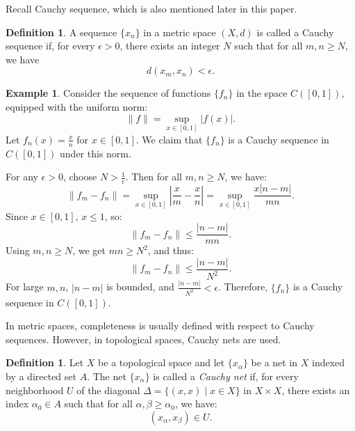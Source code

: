 \documentclass[12pt, reqno]{amsart}
\theoremstyle{definition}
\newtheorem{definition}[theorem]{Definition}
\newtheorem{example}[theorem]{Example}
\numberwithin{equation}{section}
\newcommand{\dR}{{\mathbb R}}
\begin{document}
Recall Cauchy sequence, which is also mentioned later in this paper.
\begin{definition}
    A sequence $ \{x_n\} $ in a metric space $(X, d)$ is called a Cauchy sequence if, for every $ \epsilon > 0 $, there exists an integer $ N $ such that for all $ m, n \geq N $, we have
\[ d(x_m, x_n) < \epsilon. \]
\end{definition}

\begin{example}
    Consider the sequence of functions \( \{f_n\} \) in the space \( C([0, 1]) \), equipped with the uniform norm:
    $$
    \|f\| = \sup_{x \in [0, 1]} |f(x)|.
    $$
    Let \( f_n(x) = \frac{x}{n} \) for \( x \in [0, 1] \). We claim that \( \{f_n\} \) is a Cauchy sequence in \( C([0, 1]) \) under this norm.

    For any \( \epsilon > 0 \), choose \( N > \frac{1}{\epsilon} \). Then for all \( m, n \geq N \), we have:
    $$
    \|f_m - f_n\| = \sup_{x \in [0, 1]} \left| \frac{x}{m} - \frac{x}{n} \right| = \sup_{x \in [0, 1]} \frac{x |n - m|}{mn}.
    $$
    Since \( x \in [0, 1] \), \( x \leq 1 \), so:
    $$
    \|f_m - f_n\| \leq \frac{|n - m|}{mn}.
    $$
    Using \( m, n \geq N \), we get \( mn \geq N^2 \), and thus:
    $$
    \|f_m - f_n\| \leq \frac{|n - m|}{N^2}.
    $$
    For large \( m, n \), \( |n - m| \) is bounded, and \( \frac{|n - m|}{N^2} < \epsilon \). Therefore, \( \{f_n\} \) is a Cauchy sequence in \( C([0, 1]) \).
\end{example}


\begin{comment} 
\begin{example}
Consider the sequence $ x_n = \frac{1}{n} $ in $ \dR $. We claim that this sequence is a Cauchy sequence. For any $ \epsilon > 0 $, choose $ N = \left\lceil \frac{1}{\epsilon} \right\rceil $. Then for all $ m, n \geq N $, we have
$$ |x_m - x_n| = \left| \frac{1}{m} - \frac{1}{n} \right| = \frac{|n - m|}{mn} \leq \frac{1}{N} < \epsilon. $$
Hence, $ \{x_n\} $ is a Cauchy sequence.
\end{example} 
\end{comment}

In metric spaces, completeness is usually defined with respect to Cauchy sequences. However, in topological spaces, Cauchy nets are used.

\begin{definition}
Let $X$ be a topological space and let $\{ x_\alpha \}$ be a net in $X$ indexed by a directed set $A$. The net $\{ x_\alpha \}$ is called a \textit{Cauchy net} if, for every neighborhood $U$ of the diagonal $\Delta = \{ (x,x) \mid x \in X \}$ in $X \times X$, there exists an index $\alpha_0 \in A$ such that for all $\alpha, \beta \geq \alpha_0$, we have:
$$ (x_\alpha, x_\beta) \in U. $$
\end{definition}
\end{document}
